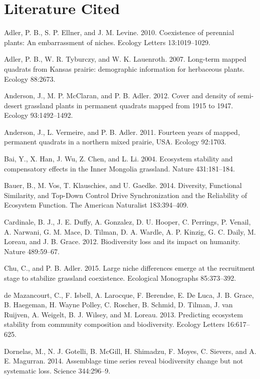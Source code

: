 \documentclass[12pt,]{article}
\begin{document}
\setlength{\parindent}{0ex}

\section{Literature Cited}

Adler, P. B., S. P. Ellner, and J. M. Levine. 2010. Coexistence of
perennial plants: An embarrassment of niches. Ecology Letters
13:1019--1029.

Adler, P. B., W. R. Tyburczy, and W. K. Lauenroth. 2007. Long-term
mapped quadrats from Kansas prairie: demographic information for
herbaceous plants. Ecology 88:2673.

Anderson, J., M. P. McClaran, and P. B. Adler. 2012. Cover and density
of semi-desert grassland plants in permanent quadrats mapped from 1915
to 1947. Ecology 93:1492--1492.

Anderson, J., L. Vermeire, and P. B. Adler. 2011. Fourteen years of
mapped, permanent quadrats in a northern mixed prairie, USA. Ecology
92:1703.

Bai, Y., X. Han, J. Wu, Z. Chen, and L. Li. 2004. Ecosystem stability
and compensatory effects in the Inner Mongolia grassland. Nature
431:181--184.

Bauer, B., M. Vos, T. Klauschies, and U. Gaedke. 2014. Diversity,
Functional Similarity, and Top-Down Control Drive Synchronization and
the Reliability of Ecosystem Function. The American Naturalist
183:394--409.

Cardinale, B. J., J. E. Duffy, A. Gonzalez, D. U. Hooper, C. Perrings,
P. Venail, A. Narwani, G. M. Mace, D. Tilman, D. A. Wardle, A. P.
Kinzig, G. C. Daily, M. Loreau, and J. B. Grace. 2012. Biodiversity loss
and its impact on humanity. Nature 489:59--67.

Chu, C., and P. B. Adler. 2015. Large niche differences emerge at the
recruitment stage to stabilize grassland coexistence. Ecological
Monographs 85:373--392.

{{de Mazancourt}}, C., F. Isbell, A. Larocque, F. Berendse, E. {De
Luca}, J. B. Grace, B. Haegeman, H. {Wayne Polley}, C. Roscher, B.
Schmid, D. Tilman, J. van Ruijven, A. Weigelt, B. J. Wilsey, and M.
Loreau. 2013. Predicting ecosystem stability from community composition
and biodiversity. Ecology Letters 16:617--625.

Dornelas, M., N. J. Gotelli, B. McGill, H. Shimadzu, F. Moyes, C.
Sievers, and A. E. Magurran. 2014. Assemblage time series reveal
biodiversity change but not systematic loss. Science 344:296--9.
\end{document}

